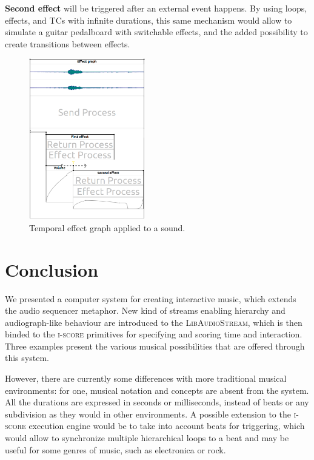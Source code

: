 \documentclass{article}
\newcommand*{\LibAudioStream}{\textsc{LibAudioStream}\xspace}
\newcommand*{\iscore}{\textsc{i-score}\xspace}
\newcommand*{\timeconstraints}{\acp{TC}\xspace}
\begin{document}
\textbf{Second effect} will be triggered after an external event happens.
By using loops, effects, and \timeconstraints with infinite durations, this same mechanism would allow to simulate a guitar pedalboard with switchable effects, and the added possibility to create transitions between effects.

\begin{figure}[h]
    \centering
    \includegraphics[width=0.45\textwidth]{figures/ex3.png}
    \caption{Temporal effect graph applied to a sound.}
    \label{fig.score3}
\end{figure}

\section{Conclusion}
We presented a computer system for creating interactive music, which extends the audio sequencer metaphor.
New kind of streams enabling hierarchy and audiograph-like behaviour are introduced to the \LibAudioStream, which is then binded to the \iscore primitives for specifying and scoring time and interaction.
Three examples present the various musical possibilities that are offered
through this system.

However, there are currently some differences with more traditional musical environments: for one, musical notation and concepts are absent from the system.
All the durations are expressed in seconds or milliseconds, instead of beats or any subdivision as they would in other environments. 
A possible extension to the \iscore execution engine would be to take into account beats for triggering, which would allow to synchronize multiple hierarchical loops to a beat and may be useful for some genres of music, such as electronica or rock.
\end{document}
